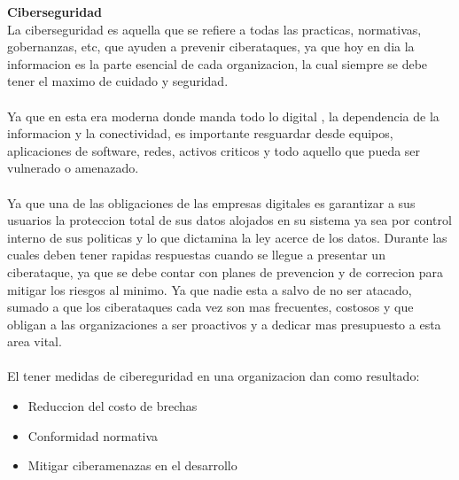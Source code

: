 \documentclass[12pt]{article}
\begin{document}
\vspace{1em}
\noindent\textbf{Ciberseguridad} \\
La ciberseguridad es aquella que se refiere a todas las practicas, normativas, gobernanzas, etc, que ayuden a prevenir ciberataques, ya que hoy en dia la informacion es la parte esencial de cada organizacion, la cual siempre se debe tener el maximo de cuidado y seguridad. \\ \\
Ya que en esta era moderna donde manda todo lo digital , la dependencia de la informacion y la conectividad, es importante resguardar desde equipos, aplicaciones de software, redes, activos criticos y todo aquello que pueda ser vulnerado o amenazado.\\\\
Ya que una de las obligaciones de las empresas digitales es garantizar a sus usuarios la proteccion total de sus datos alojados en su sistema ya sea por control interno de sus politicas y lo que dictamina la ley acerce de los datos. Durante las cuales deben tener rapidas respuestas cuando se llegue a presentar un ciberataque, ya que se debe contar con planes de prevencion y de correcion para mitigar los riesgos al minimo. Ya que nadie esta a salvo de no ser atacado, sumado a que los ciberataques cada vez son mas frecuentes, costosos y que obligan a las organizaciones a ser proactivos y a dedicar mas presupuesto a esta area vital.
\\\\
El tener medidas de cibereguridad en una organizacion dan como resultado:
\begin{itemize}
    \item Reduccion del costo de brechas
    \item Conformidad normativa
    \item Mitigar ciberamenazas en el desarrollo
\end{itemize}
\end{document}
